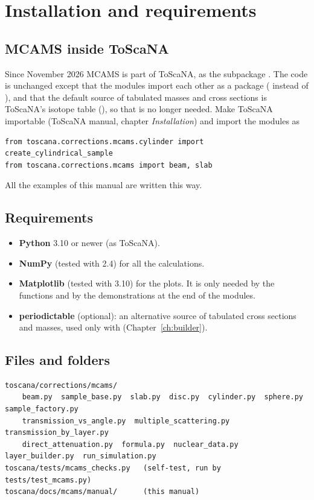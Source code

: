\chapter{Installation and requirements}
\label{ch:install}

\section{MCAMS inside ToScaNA}

Since November 2026 MCAMS is part of ToScaNA, as the subpackage
. The code is unchanged except that the modules
import each other as a package ( instead of
), and that the default source of tabulated masses and cross
sections is ToScaNA's isotope table (), so that
 is no longer needed. Make ToScaNA importable (ToScaNA
manual, chapter \emph{Installation}) and import the modules as
\begin{lstlisting}[style=shell]
from toscana.corrections.mcams.cylinder import create_cylindrical_sample
from toscana.corrections.mcams import beam, slab
\end{lstlisting}
All the examples of this manual are written this way.

\section{Requirements}

\begin{itemize}
  \item \textbf{Python} 3.10 or newer (as ToScaNA).
  \item \textbf{NumPy} (tested with 2.4) for all the calculations.
  \item \textbf{Matplotlib} (tested with 3.10) for the plots. It is only needed by the 
        functions and by the demonstrations at the end of the modules.
  \item \textbf{periodictable} (optional): an alternative source of tabulated cross sections and masses,
        used only with  (Chapter~\ref{ch:builder}).
\end{itemize}

\section{Files and folders}

\begin{lstlisting}[style=shell]
toscana/corrections/mcams/
    beam.py  sample_base.py  slab.py  disc.py  cylinder.py  sphere.py  sample_factory.py
    transmission_vs_angle.py  multiple_scattering.py  transmission_by_layer.py
    direct_attenuation.py  formula.py  nuclear_data.py  layer_builder.py  run_simulation.py
toscana/tests/mcams_checks.py   (self-test, run by tests/test_mcams.py)
toscana/docs/mcams/manual/      (this manual)
\end{lstlisting}

